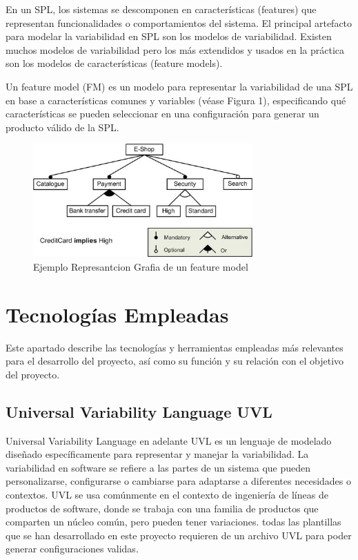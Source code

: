 \documentclass[12pt, a4paper, twoside]{article}
\begin{document}
En un SPL, los sistemas se descomponen en características (features) que representan funcionalidades o comportamientos del sistema. 
El principal artefacto para modelar la variabilidad en SPL son los modelos de variabilidad. Existen muchos modelos 
de variabilidad pero los más extendidos y usados en la práctica son los modelos de características (feature models). 

Un feature model (FM) \cite{wikipedia_feature_model} es un modelo para representar la variabilidad de una SPL en base a características comunes y 
variables (véase Figura 1), especificando qué características se pueden seleccionar en una configuración para generar 
un producto válido de la SPL.  

\begin{figure}[ht]
	\centering
		\includegraphics[width=0.75\textwidth]{fm.example.jpg}
	\caption{Ejemplo Represantcion Grafia de un feature model \cite{wikipedia_feature_model}}
\end{figure}












\section{Tecnologías Empleadas}
\label{sec:Tecnologias Empleadas}
Este apartado describe las tecnologías y herramientas empleadas más relevantes para el desarrollo del proyecto, así como su función y su relación con el objetivo del proyecto.

\subsection{Universal Variability Language UVL}

Universal Variability Language en adelante UVL \cite{uvl} es un lenguaje de modelado diseñado específicamente para representar y manejar la variabilidad. 
La variabilidad en software se refiere a las partes de un sistema que pueden personalizarse, configurarse o cambiarse para adaptarse a diferentes necesidades o contextos. 
UVL se usa comúnmente en el contexto de ingeniería de líneas de productos de software, donde se trabaja con una familia de productos que comparten un núcleo común, pero pueden tener variaciones.
todas las plantillas que se han desarrollado en este proyecto requieren de un archivo UVL para poder generar configuraciones validas.
\end{document}
